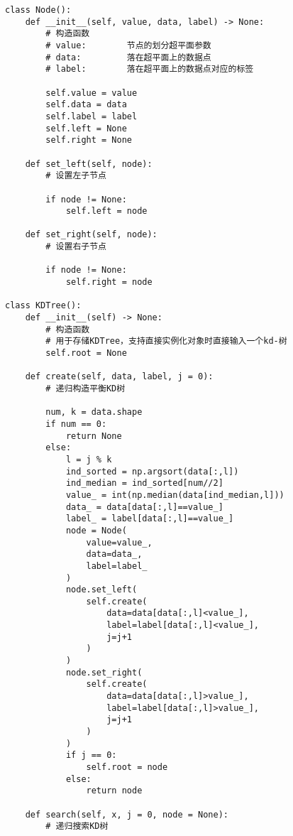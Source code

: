 \begin{lstlisting}[caption = kd-树构造算法和搜索算法实现]
	class Node():
    def __init__(self, value, data, label) -> None:
        # 构造函数
        # value:        节点的划分超平面参数
        # data:         落在超平面上的数据点
        # label:        落在超平面上的数据点对应的标签

        self.value = value
        self.data = data
        self.label = label
        self.left = None
        self.right = None
    
    def set_left(self, node):
        # 设置左子节点

        if node != None:
            self.left = node

    def set_right(self, node):
        # 设置右子节点

        if node != None:
            self.right = node

class KDTree():
    def __init__(self) -> None:
        # 构造函数
        # 用于存储KDTree，支持直接实例化对象时直接输入一个kd-树
        self.root = None
    
    def create(self, data, label, j = 0):
        # 递归构造平衡KD树

        num, k = data.shape
        if num == 0:
            return None
        else:
            l = j % k
            ind_sorted = np.argsort(data[:,l])
            ind_median = ind_sorted[num//2]
            value_ = int(np.median(data[ind_median,l]))
            data_ = data[data[:,l]==value_]
            label_ = label[data[:,l]==value_]
            node = Node(
                value=value_,
                data=data_,
                label=label_
            )
            node.set_left(
                self.create(
                    data=data[data[:,l]<value_],
                    label=label[data[:,l]<value_],
                    j=j+1
                )
            )
            node.set_right(
                self.create(
                    data=data[data[:,l]>value_],
                    label=label[data[:,l]>value_],
                    j=j+1
                )
            )
            if j == 0:
                self.root = node
            else:
                return node
    
    def search(self, x, j = 0, node = None):
        # 递归搜索KD树


\end{lstlisting}
